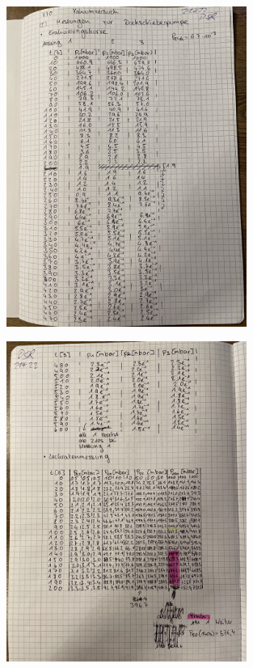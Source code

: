 \begin{figure}
    \centering
    \includegraphics[width=0.7\textwidth]{abb/IMG_3226.jpg}
\end{figure}
\begin{figure}
    \centering
    \includegraphics[width=0.7\textwidth]{abb/IMG_3227.jpg}
\end{figure}
